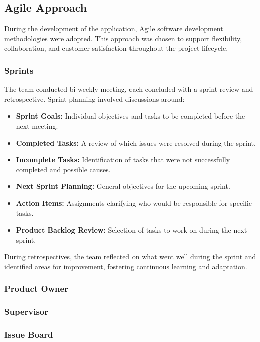 \subsection{Agile Approach}
\label{subsec:agile-approach}

During the development of the application, Agile software development methodologies were adopted. This approach was chosen to support flexibility, collaboration, and customer satisfaction throughout the project lifecycle.

\subsubsection*{Sprints}

The team conducted bi-weekly meeting, each concluded with a sprint review and retrospective. Sprint planning involved discussions around:

\begin{itemize}
  \item \textbf{Sprint Goals:} Individual objectives and tasks to be completed before the next meeting.
  \item \textbf{Completed Tasks:} A review of which issues were resolved during the sprint.
  \item \textbf{Incomplete Tasks:} Identification of tasks that were not successfully completed and possible causes.
  \item \textbf{Next Sprint Planning:} General objectives for the upcoming sprint.
  \item \textbf{Action Items:} Assignments clarifying who would be responsible for specific tasks.
  \item \textbf{Product Backlog Review:} Selection of tasks to work on during the next sprint.
\end{itemize}

During retrospectives, the team reflected on what went well during the sprint and identified areas for improvement, fostering continuous learning and adaptation.

\subsubsection*{Product Owner}

\subsubsection*{Supervisor}

\subsubsection*{Issue Board}

